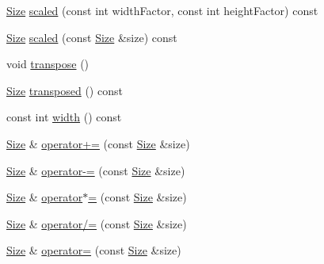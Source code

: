 \begin{DoxyCompactItemize}
\item 
\hyperlink{classprism_1_1_size}{Size} \hyperlink{classprism_1_1_size_ad15785fa5d1a1bb8f453185e39c1a598}{scaled} (const int width\+Factor, const int height\+Factor) const 
\item 
\hyperlink{classprism_1_1_size}{Size} \hyperlink{classprism_1_1_size_a6f87084cf55571eda2a1213f77b01c0e}{scaled} (const \hyperlink{classprism_1_1_size}{Size} \&size) const 
\item 
void \hyperlink{classprism_1_1_size_ab1e9872f48f2ec894849973d6a325af6}{transpose} ()
\item 
\hyperlink{classprism_1_1_size}{Size} \hyperlink{classprism_1_1_size_aaf2b4a70bfe6f18224c25f64901d8d8a}{transposed} () const 
\item 
const int \hyperlink{classprism_1_1_size_a596f8cbdf0baa999e9652c702d58f0f3}{width} () const 
\item 
\hyperlink{classprism_1_1_size}{Size} \& \hyperlink{classprism_1_1_size_a8466425caae5356a296516a35ea27454}{operator+=} (const \hyperlink{classprism_1_1_size}{Size} \&size)
\item 
\hyperlink{classprism_1_1_size}{Size} \& \hyperlink{classprism_1_1_size_a6a53cf7b721996475f1cd46d3b69aa4c}{operator-\/=} (const \hyperlink{classprism_1_1_size}{Size} \&size)
\item 
\hyperlink{classprism_1_1_size}{Size} \& \hyperlink{classprism_1_1_size_a92558161b30b9c225a975918112ad3ff}{operator$\ast$=} (const \hyperlink{classprism_1_1_size}{Size} \&size)
\item 
\hyperlink{classprism_1_1_size}{Size} \& \hyperlink{classprism_1_1_size_af2055fdb7949e5dc4d16feaf65fd0a5d}{operator/=} (const \hyperlink{classprism_1_1_size}{Size} \&size)
\item 
\hyperlink{classprism_1_1_size}{Size} \& \hyperlink{classprism_1_1_size_ab0a50414c060bc156336bb0943acbbe0}{operator=} (const \hyperlink{classprism_1_1_size}{Size} \&size)
\end{DoxyCompactItemize}
